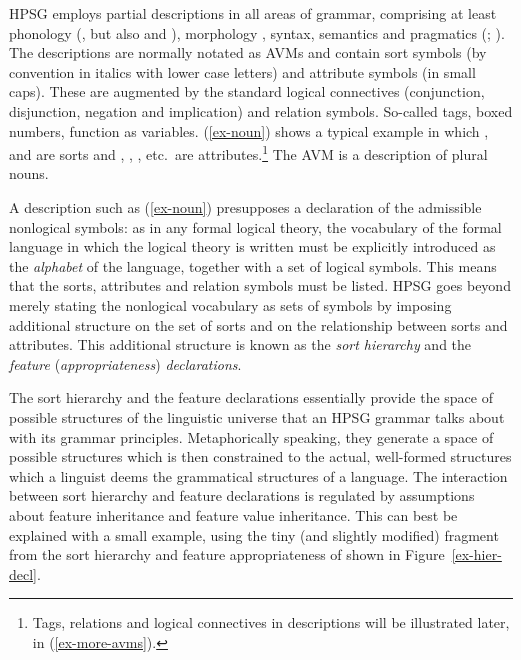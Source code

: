 \documentclass[output=paper
 	        ,biblatex
                ,babelshorthands
                ,newtxmath
                ,draftmode
                ,colorlinks, citecolor=brown
]{langscibook}
\begin{document}
HPSG employs partial descriptions in all areas of grammar, comprising
at least phonology (\citealp{Hoehle99a-u}, but also \citealp{BK94b} and
\citealp{Walther99a-u}), morphology , syntax,
semantics  and pragmatics (; ).
The descriptions are normally notated as AVMs and contain sort symbols (by
convention in italics with lower case letters) and attribute symbols
(in small caps). These are augmented by the standard
logical connectives (conjunction, disjunction, negation and
implication) and relation symbols. So-called tags, boxed
numbers, function as variables. (\ref{ex-noun}) shows a typical example
in which ,  and  are sorts and
, , , etc.\ are attributes.\footnote{Tags, relations and logical connectives in descriptions will be illustrated later, in (\ref{ex-more-avms}).}
The AVM is a description of plural nouns.

\ea
\label{ex-noun}
\z

A description such as (\ref{ex-noun}) presupposes a declaration of the
admissible nonlogical symbols: as in any formal logical theory, the
vocabulary of the formal language in which the logical theory is
written must be explicitly introduced as the \emph{alphabet} of the
language, together with a set of logical symbols. This means that the
sorts, attributes and relation symbols must be listed. HPSG
goes beyond merely stating the nonlogical vocabulary as sets of
symbols by imposing additional structure on the set of sorts and on
the relationship between sorts and attributes. This additional
structure is known as the \emph{sort hierarchy} and the \emph{feature}
  (\emph{appropriateness}) \emph{declarations}.

The sort hierarchy and the feature declarations essentially provide the
space of possible structures of the linguistic universe that an HPSG
grammar talks about with its grammar principles. Metaphorically
speaking, they generate a space of possible structures which is then
constrained to the actual, well-formed structures which a
linguist deems the grammatical structures of a language. The
interaction between sort hierarchy and feature declarations is
regulated by assumptions about feature inheritance and feature value
inheritance. This can best be explained with a small example, using
the tiny (and slightly modified) fragment from the sort hierarchy and
feature appropriateness of  shown in
Figure~\ref{ex-hier-decl}.
\end{document}
